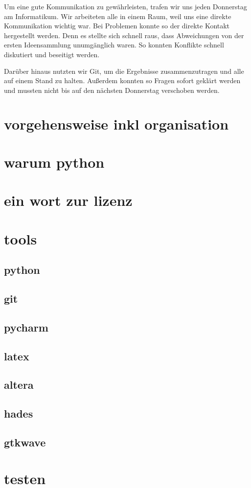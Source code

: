 Um eine gute Kommunikation zu gewährleisten, trafen wir uns jeden Donnerstag am Informatikum. Wir arbeiteten alle in einem Raum, weil uns eine direkte Kommunikation wichtig war. Bei Problemen konnte so der direkte Kontakt hergestellt werden. Denn es stellte sich schnell raus, dass Abweichungen von der ersten Ideensammlung unumgänglich waren. So konnten Konflikte schnell diskutiert und beseitigt werden.

Darüber hinaus nutzten wir Git, um die Ergebnisse zusammenzutragen und alle auf einem Stand zu halten. Außerdem konnten so Fragen sofort geklärt werden und mussten nicht bis auf den nächsten Donnerstag verschoben werden.

\section{vorgehensweise inkl organisation}
\section{warum python} %
\section{ein wort zur lizenz} %
\section{tools}
\subsection{python}
\subsection{git}
\subsection{pycharm}
\subsection{latex}
\subsection{altera}
\subsection{hades}
\subsection{gtkwave}
\section{testen}
